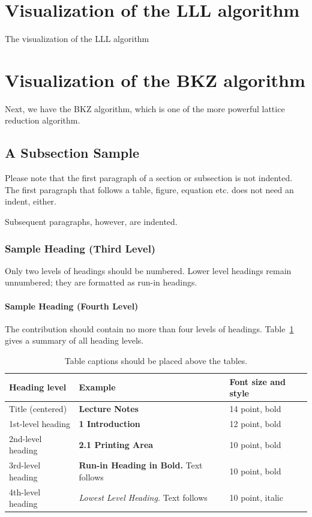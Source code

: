 \documentclass[runningheads]{llncs}
\begin{document}
\section{Visualization of the LLL algorithm}
The visualization of the LLL algorithm 

\section{Visualization of the BKZ algorithm}
Next, we have the BKZ algorithm, which is one of the more powerful lattice reduction algorithm. 

\subsection{A Subsection Sample}
Please note that the first paragraph of a section or subsection is
not indented. The first paragraph that follows a table, figure,
equation etc. does not need an indent, either.

Subsequent paragraphs, however, are indented.

\subsubsection{Sample Heading (Third Level)} Only two levels of
headings should be numbered. Lower level headings remain unnumbered;
they are formatted as run-in headings.

\paragraph{Sample Heading (Fourth Level)}
The contribution should contain no more than four levels of
headings. Table~\ref{tab1} gives a summary of all heading levels.

\begin{table}
\caption{Table captions should be placed above the
tables.}\label{tab1}
\begin{tabular}{|l|l|l|}
\hline
Heading level &  Example & Font size and style\\
\hline
Title (centered) &  {\Large\bfseries Lecture Notes} & 14 point, bold\\
1st-level heading &  {\large\bfseries 1 Introduction} & 12 point, bold\\
2nd-level heading & {\bfseries 2.1 Printing Area} & 10 point, bold\\
3rd-level heading & {\bfseries Run-in Heading in Bold.} Text follows & 10 point, bold\\
4th-level heading & {\itshape Lowest Level Heading.} Text follows & 10 point, italic\\
\hline
\end{tabular}
\end{table}
\end{document}
